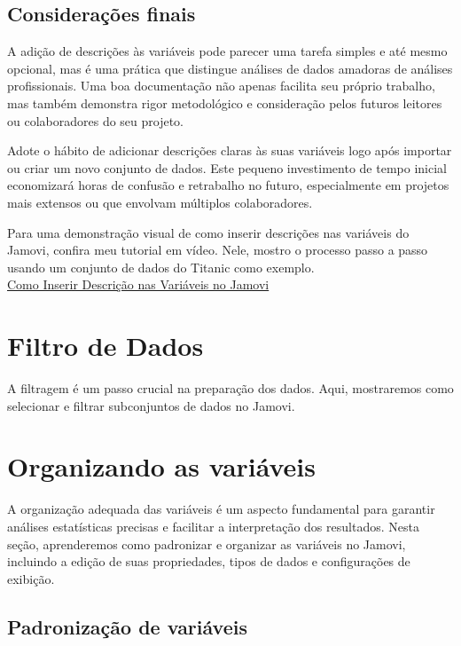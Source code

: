 \subsection{Considerações finais}

A adição de descrições às variáveis pode parecer uma tarefa simples e até mesmo opcional, mas é uma prática que distingue análises de dados amadoras de análises profissionais. Uma boa documentação não apenas facilita seu próprio trabalho, mas também demonstra rigor metodológico e consideração pelos futuros leitores ou colaboradores do seu projeto.

Adote o hábito de adicionar descrições claras às suas variáveis logo após importar ou criar um novo conjunto de dados. Este pequeno investimento de tempo inicial economizará horas de confusão e retrabalho no futuro, especialmente em projetos mais extensos ou que envolvam múltiplos colaboradores.

\begin{tcolorbox}[colback=white,colframe=red,title={\faPlayCircle \ Dica de Conteúdo}]
  Para uma demonstração visual de como inserir descrições nas variáveis do Jamovi, confira meu tutorial em vídeo. Nele, mostro o processo passo a passo usando um conjunto de dados do Titanic como exemplo.\\
  \textcolor{red}{\faYoutube} \href{https://youtu.be/00HUaQaRt_E?si=JdYJKYGYpf6Orlox}{Como Inserir Descrição nas Variáveis no Jamovi}
\end{tcolorbox}

\section{Filtro de Dados}
A filtragem é um passo crucial na preparação dos dados. Aqui, mostraremos como selecionar e filtrar subconjuntos de dados no Jamovi.

\section{Organizando as variáveis}

A organização adequada das variáveis é um aspecto fundamental para garantir análises estatísticas precisas e facilitar a interpretação dos resultados. Nesta seção, aprenderemos como padronizar e organizar as variáveis no Jamovi, incluindo a edição de suas propriedades, tipos de dados e configurações de exibição.

\subsection{Padronização de variáveis}

